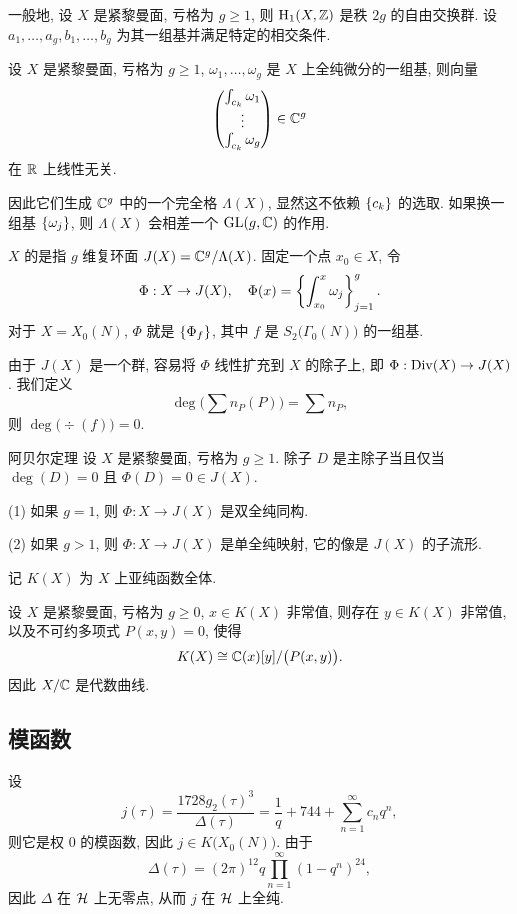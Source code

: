 一般地, 设 $X$ 是紧黎曼面, 亏格为 $g\ge 1$, 则 ${\mathrm{H}}_1(X,{\mathbb{Z}})$ 是秩 $2g$ 的自由交换群. 设 $a_1,\dots,a_g,b_1,\dots,b_g$ 为其一组基并满足特定的相交条件.

\begin{proposition}{}{}
设 $X$ 是紧黎曼面, 亏格为 $g\ge 1$, $\omega_1,\dots,\omega_g$ 是 $X$ 上全纯微分的一组基, 则向量
  \[\begin{pmatrix}
    \int_{c_k} \omega_1\\
    \vdots\\
    \int_{c_k} \omega_g
  \end{pmatrix}\in{\mathbb{C}}^g\]
在 ${\mathbb{R}}$ 上线性无关.
\end{proposition}
因此它们生成 ${\mathbb{C}}^g$ 中的一个完全格 $\Lambda(X)$, 显然这不依赖 $\left\{c_k\right\}$ 的选取. 如果换一组基 $\left\{\omega_j\right\}$, 则 $\Lambda(X)$ 会相差一个 ${\mathrm{GL}}(g,{\mathbb{C}})$ 的作用.

$X$ 的是指 $g$ 维复环面 $J(X)={\mathbb{C}}^g/\Lambda(X)$. 固定一个点 $x_0\in X$, 令
  \[\Phi:X\to J(X),\quad \Phi(x)=\left\{\int_{x_0}^x\omega_j\right\}_{j=1}^g.\]
对于 $X=X_0(N)$, $\Phi$ 就是 $\left\{\Phi_f\right\}$, 其中 $f$ 是 $S_2\bigl(\Gamma_0(N)\bigr)$ 的一组基.

由于 $J(X)$ 是一个群, 容易将 $\Phi$ 线性扩充到 $X$ 的除子上, 即 $\Phi:{\mathrm{Div}}(X)\to J(X)$. 我们定义
  \[\deg\bigl(\sum n_P (P)\bigr)=\sum n_P,\]
则 $\deg\bigl(\div(f)\bigr)=0$.

\begin{theorem}{阿贝尔定理}{}
设 $X$ 是紧黎曼面, 亏格为 $g\ge 1$. 除子 $D$ 是主除子当且仅当 $\deg(D)=0$ 且 $\Phi(D)=0\in J(X)$.
\end{theorem}

\begin{corollary}{}{}
(1) 如果 $g=1$, 则 $\Phi:X\to J(X)$ 是双全纯同构.

(2) 如果 $g>1$, 则 $\Phi:X\to J(X)$ 是单全纯映射, 它的像是 $J(X)$ 的子流形.
\end{corollary}

记 $K(X)$ 为 $X$ 上亚纯函数全体.
\begin{theorem}{}{}
设 $X$ 是紧黎曼面, 亏格为 $g\ge 0$, $x\in K(X)$ 非常值, 则存在 $y\in K(X)$ 非常值, 以及不可约多项式 $P(x,y)=0$, 使得
  \[K(X)\cong{\mathbb{C}}(x)[y]/\bigl(P(x,y)\bigr).\]
因此 $X/{\mathbb{C}}$ 是代数曲线.
\end{theorem}


\subsection{模函数}
设
  \[j(\tau)=\frac{1728 g_2(\tau)^3}{\Delta(\tau)}=\frac1q+744+\sum_{n=1}^\infty c_n q^n,\]
则它是权 $0$ 的模函数, 因此 $j\in K\bigl(X_0(N)\bigr)$. 由于
  \[\Delta(\tau)=(2\pi)^{12}q\prod_{n=1}^\infty(1-q^n)^{24},\]
因此 $\Delta$ 在 ${\mathcal{H}}$ 上无零点, 从而 $j$ 在 ${\mathcal{H}}$ 上全纯.

